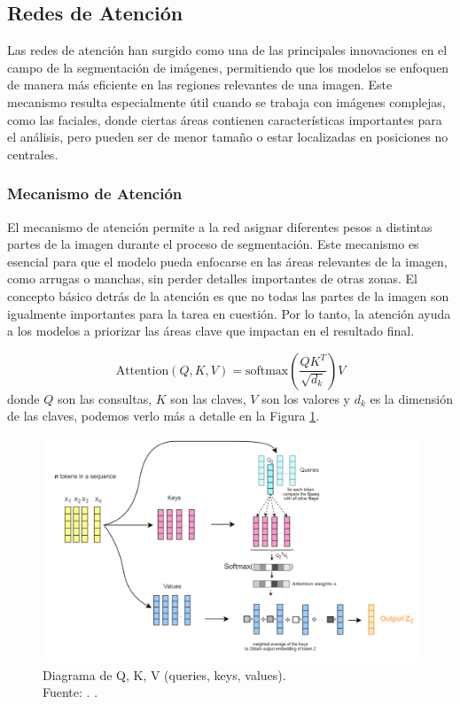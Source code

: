 \subsection{Redes de Atención}  
Las redes de atención han surgido como una de las principales innovaciones en el campo de la segmentación de imágenes, permitiendo que los modelos se enfoquen de manera más eficiente en las regiones relevantes de una imagen. Este mecanismo resulta especialmente útil cuando se trabaja con imágenes complejas, como las faciales, donde ciertas áreas contienen características importantes para el análisis, pero pueden ser de menor tamaño o estar localizadas en posiciones no centrales. \parencite{autor2021atencion}

\subsubsection{Mecanismo de Atención}  
El mecanismo de atención permite a la red asignar diferentes pesos a distintas partes de la imagen durante el proceso de segmentación. Este mecanismo es esencial para que el modelo pueda enfocarse en las áreas relevantes de la imagen, como arrugas o manchas, sin perder detalles importantes de otras zonas. El concepto básico detrás de la atención es que no todas las partes de la imagen son igualmente importantes para la tarea en cuestión. Por lo tanto, la atención ayuda a los modelos a priorizar las áreas clave que impactan en el resultado final. \parencite{autor2021atencion}  

\begin{equation}\label{eq:atencion}
    \text{Attention}(Q, K, V) = \text{softmax}\left(\frac{QK^T}{\sqrt{d_k}}\right)V
\end{equation}
donde $Q$ son las consultas, $K$ son las claves, $V$ son los valores y $d_k$ es la dimensión de las claves, podemos verlo más a detalle en la Figura \ref{2:figeqbasmat}. 

\begin{figure}[H]
	\begin{center}
		\includegraphics[width=1\textwidth]{2/figures/eqbasmat.png}
		\caption[Diagrama de Q, K, V (queries, keys, values)]{Diagrama de Q, K, V (queries, keys, values).\\
		Fuente: \cite{vaswani2025transformers}. .}
		\label{2:figeqbasmat}
	\end{center}
\end{figure}

